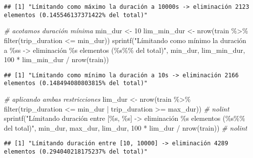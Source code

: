 \documentclass[
]{article}
\newenvironment{Shaded}{\begin{snugshade}}{\end{snugshade}}
\newcommand{\CommentTok}[1]{\textcolor[rgb]{0.56,0.35,0.01}{\textit{#1}}}
\newcommand{\DecValTok}[1]{\textcolor[rgb]{0.00,0.00,0.81}{#1}}
\newcommand{\FunctionTok}[1]{\textcolor[rgb]{0.00,0.00,0.00}{#1}}
\newcommand{\NormalTok}[1]{#1}
\newcommand{\OtherTok}[1]{\textcolor[rgb]{0.56,0.35,0.01}{#1}}
\newcommand{\SpecialCharTok}[1]{\textcolor[rgb]{0.00,0.00,0.00}{#1}}
\newcommand{\StringTok}[1]{\textcolor[rgb]{0.31,0.60,0.02}{#1}}
\begin{document}
\begin{verbatim}
## [1] "Límitando como máximo la duración a 10000s -> eliminación 2123 elementos (0.145546137371422% del total)"
\end{verbatim}

\begin{Shaded}
\begin{Highlighting}[]
\CommentTok{\# acotamos duración mínima}
\NormalTok{min\_dur }\OtherTok{\textless{}{-}} \DecValTok{10}
\NormalTok{lim\_min\_dur }\OtherTok{\textless{}{-}} \FunctionTok{nrow}\NormalTok{(train }\SpecialCharTok{\%\textgreater{}\%} \FunctionTok{filter}\NormalTok{(trip\_duration }\SpecialCharTok{\textless{}=}\NormalTok{ min\_dur))}
\FunctionTok{sprintf}\NormalTok{(}\StringTok{"Límitando como mínimo la duración a \%ss {-}\textgreater{} eliminación \%s elementos (\%s\%\% del total)"}\NormalTok{, min\_dur, lim\_min\_dur, }\DecValTok{100} \SpecialCharTok{*}\NormalTok{ lim\_min\_dur }\SpecialCharTok{/} \FunctionTok{nrow}\NormalTok{(train))}
\end{Highlighting}
\end{Shaded}

\begin{verbatim}
## [1] "Límitando como mínimo la duración a 10s -> eliminación 2166 elementos (0.148494080803815% del total)"
\end{verbatim}

\begin{Shaded}
\begin{Highlighting}[]
\CommentTok{\# aplicando ambas restricciones}
\NormalTok{lim\_dur }\OtherTok{\textless{}{-}} \FunctionTok{nrow}\NormalTok{(train }\SpecialCharTok{\%\textgreater{}\%} \FunctionTok{filter}\NormalTok{(trip\_duration }\SpecialCharTok{\textless{}=}\NormalTok{ min\_dur }\SpecialCharTok{|}\NormalTok{ trip\_duration }\SpecialCharTok{\textgreater{}=}\NormalTok{ max\_dur)) }\CommentTok{\# nolint}
\FunctionTok{sprintf}\NormalTok{(}\StringTok{"Límitando duración entre [\%s, \%s] {-}\textgreater{} eliminación \%s elementos (\%s\%\% del total)"}\NormalTok{, min\_dur, max\_dur, lim\_dur, }\DecValTok{100} \SpecialCharTok{*}\NormalTok{ lim\_dur }\SpecialCharTok{/} \FunctionTok{nrow}\NormalTok{(train)) }\CommentTok{\# nolint}
\end{Highlighting}
\end{Shaded}

\begin{verbatim}
## [1] "Límitando duración entre [10, 10000] -> eliminación 4289 elementos (0.294040218175237% del total)"
\end{verbatim}
\end{document}

